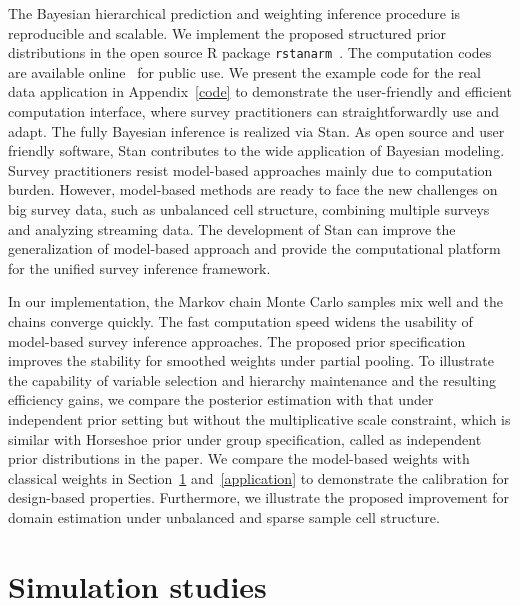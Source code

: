 \documentclass[11pt]{article}
\numberwithin{figure}{section}
\numberwithin{table}{section}
\numberwithin{equation}{section}
\begin{document}
The Bayesian hierarchical prediction and weighting inference procedure is
reproducible and scalable. We implement the proposed structured prior
distributions in the open source R package {\tt rstanarm}~\citep{rstanarm}. The
computation codes are available online~\citep{code:si} for public use. We
present the example code for the real data application in Appendix~\ref{code}
to demonstrate the user-friendly and efficient computation interface, where
survey practitioners can straightforwardly use and adapt. The fully Bayesian
inference is realized via Stan. As open source and user friendly software, Stan
contributes to the wide application of Bayesian modeling. Survey practitioners
resist model-based approaches mainly due to computation burden. However,
model-based methods are ready to face the new challenges on big survey data,
such as unbalanced cell structure, combining multiple surveys and analyzing
streaming data. The development of Stan can improve the generalization of
model-based approach and provide the computational platform for the unified
survey inference framework.

In our implementation, the Markov chain Monte Carlo samples mix well and the
chains converge quickly. The fast computation speed widens the usability of
model-based survey inference approaches. The proposed prior specification
improves the stability for smoothed weights under partial pooling. To
illustrate the capability of variable selection and hierarchy maintenance and
the resulting efficiency gains, we compare the posterior estimation with that
under independent prior setting but without the multiplicative scale
constraint, which is similar with Horseshoe prior under group specification,
called as independent prior distributions in the paper. We compare the
model-based weights with classical weights in Section~\ref{simulation}
and~\ref{application} to demonstrate the calibration for design-based
properties. Furthermore, we illustrate the proposed improvement for domain
estimation under unbalanced and sparse sample cell structure. 


\section{Simulation studies} \label{simulation}
\end{document}
